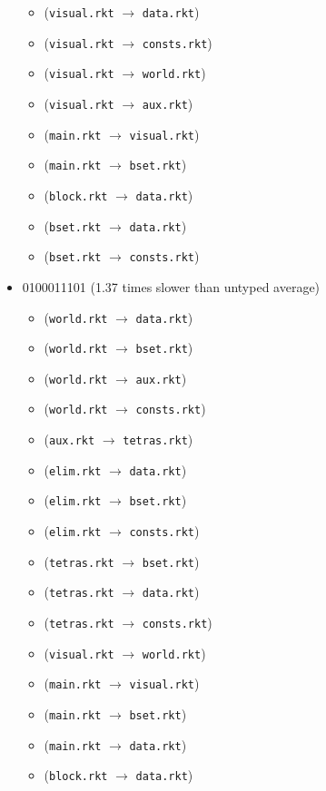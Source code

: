 \documentclass{article}
\newcommand{\mono}[1]{\texttt{#1}}
\begin{document}
\begin{itemize}
\begin{itemize}
  \item (\mono{visual.rkt} $\rightarrow$ \mono{data.rkt})
  \item (\mono{visual.rkt} $\rightarrow$ \mono{consts.rkt})
  \item (\mono{visual.rkt} $\rightarrow$ \mono{world.rkt})
  \item (\mono{visual.rkt} $\rightarrow$ \mono{aux.rkt})
  \item (\mono{main.rkt} $\rightarrow$ \mono{visual.rkt})
  \item (\mono{main.rkt} $\rightarrow$ \mono{bset.rkt})
  \item (\mono{block.rkt} $\rightarrow$ \mono{data.rkt})
  \item (\mono{bset.rkt} $\rightarrow$ \mono{data.rkt})
  \item (\mono{bset.rkt} $\rightarrow$ \mono{consts.rkt})
  \end{itemize}
\item 0100011101 (1.37 times slower than untyped average)
  \begin{itemize}
  \item (\mono{world.rkt} $\rightarrow$ \mono{data.rkt})
  \item (\mono{world.rkt} $\rightarrow$ \mono{bset.rkt})
  \item (\mono{world.rkt} $\rightarrow$ \mono{aux.rkt})
  \item (\mono{world.rkt} $\rightarrow$ \mono{consts.rkt})
  \item (\mono{aux.rkt} $\rightarrow$ \mono{tetras.rkt})
  \item (\mono{elim.rkt} $\rightarrow$ \mono{data.rkt})
  \item (\mono{elim.rkt} $\rightarrow$ \mono{bset.rkt})
  \item (\mono{elim.rkt} $\rightarrow$ \mono{consts.rkt})
  \item (\mono{tetras.rkt} $\rightarrow$ \mono{bset.rkt})
  \item (\mono{tetras.rkt} $\rightarrow$ \mono{data.rkt})
  \item (\mono{tetras.rkt} $\rightarrow$ \mono{consts.rkt})
  \item (\mono{visual.rkt} $\rightarrow$ \mono{world.rkt})
  \item (\mono{main.rkt} $\rightarrow$ \mono{visual.rkt})
  \item (\mono{main.rkt} $\rightarrow$ \mono{bset.rkt})
  \item (\mono{main.rkt} $\rightarrow$ \mono{data.rkt})
  \item (\mono{block.rkt} $\rightarrow$ \mono{data.rkt})

\end{itemize}
\end{itemize}
\end{document}
